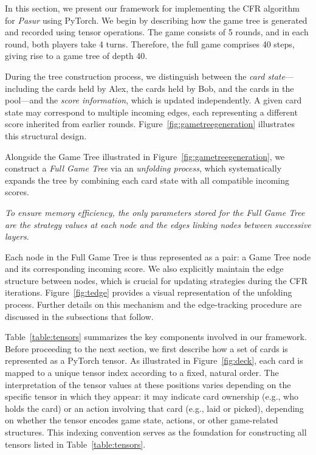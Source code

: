 In this section, we present our framework for implementing the CFR algorithm for \emph{Pasur} using PyTorch. We begin by describing how the game tree is generated and recorded using tensor operations. The game consists of 5 rounds, and in each round, both players take 4 turns. Therefore, the full game comprises 40 steps, giving rise to a game tree of depth 40.

During the tree construction process, we distinguish between the \emph{card state}—including the cards held by Alex, the cards held by Bob, and the cards in the pool—and the \emph{score information}, which is updated independently. A given card state may correspond to multiple incoming edges, each representing a different score inherited from earlier rounds. Figure~\ref{fig:gametreegeneration} illustrates this structural design.


Alongside the Game Tree illustrated in Figure~\ref{fig:gametreegeneration}, we construct a \emph{Full Game Tree} via an \emph{unfolding process}, which systematically expands the tree by combining each card state with all compatible incoming scores.

\begin{center}
\textit{To ensure memory efficiency, the only parameters stored for the Full Game Tree are the strategy values at each node and the edges linking nodes between successive layers.}
\end{center}

Each node in the Full Game Tree is thus represented as a pair: a Game Tree node and its corresponding incoming score. We also explicitly maintain the edge structure between nodes, which is crucial for updating strategies during the CFR iterations. Figure~\ref{fig:tedge} provides a visual representation of the unfolding process. Further details on this mechanism and the edge-tracking procedure are discussed in the subsections that follow.


Table~\ref{table:tensors} summarizes the key components involved in our framework.  Before proceeding to the next section, we first describe how a set of cards is represented as a PyTorch tensor. As illustrated in Figure~\ref{fig:deck}, each card is mapped to a unique tensor index according to a fixed, natural order. The interpretation of the tensor values at these positions varies depending on the specific tensor in which they appear: it may indicate card ownership (e.g., who holds the card) or an action involving that card (e.g., laid or picked), depending on whether the tensor encodes game state, actions, or other game-related structures. This indexing convention serves as the foundation for constructing all tensors listed in Table~\ref{table:tensors}.

